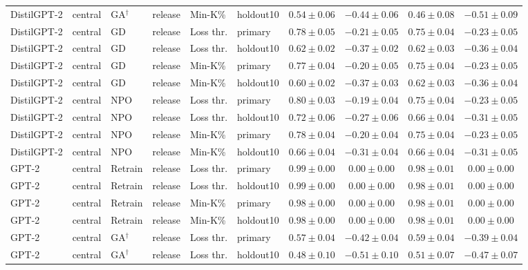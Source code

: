 {\begin{longtable}{@{\extracolsep{\fill}}llllllcccc@{}}
DistilGPT-2 & central & GA$^{\dagger}$ & release & Min-K\% & holdout10 & $0.54 \pm 0.06$ & $-0.44 \pm 0.06$ & $0.46 \pm 0.08$ & $-0.51 \pm 0.09$ \\
DistilGPT-2 & central & GD & release & Loss thr. & primary & $0.78 \pm 0.05$ & $-0.21 \pm 0.05$ & $0.75 \pm 0.04$ & $-0.23 \pm 0.05$ \\
DistilGPT-2 & central & GD & release & Loss thr. & holdout10 & $0.62 \pm 0.02$ & $-0.37 \pm 0.02$ & $0.62 \pm 0.03$ & $-0.36 \pm 0.04$ \\
DistilGPT-2 & central & GD & release & Min-K\% & primary & $0.77 \pm 0.04$ & $-0.20 \pm 0.05$ & $0.75 \pm 0.04$ & $-0.23 \pm 0.05$ \\
DistilGPT-2 & central & GD & release & Min-K\% & holdout10 & $0.60 \pm 0.02$ & $-0.37 \pm 0.03$ & $0.62 \pm 0.03$ & $-0.36 \pm 0.04$ \\
DistilGPT-2 & central & NPO & release & Loss thr. & primary & $0.80 \pm 0.03$ & $-0.19 \pm 0.04$ & $0.75 \pm 0.04$ & $-0.23 \pm 0.05$ \\
DistilGPT-2 & central & NPO & release & Loss thr. & holdout10 & $0.72 \pm 0.06$ & $-0.27 \pm 0.06$ & $0.66 \pm 0.04$ & $-0.31 \pm 0.05$ \\
DistilGPT-2 & central & NPO & release & Min-K\% & primary & $0.78 \pm 0.04$ & $-0.20 \pm 0.04$ & $0.75 \pm 0.04$ & $-0.23 \pm 0.05$ \\
DistilGPT-2 & central & NPO & release & Min-K\% & holdout10 & $0.66 \pm 0.04$ & $-0.31 \pm 0.04$ & $0.66 \pm 0.04$ & $-0.31 \pm 0.05$ \\
GPT-2 & central & Retrain & release & Loss thr. & primary & $0.99 \pm 0.00$ & $0.00 \pm 0.00$ & $0.98 \pm 0.01$ & $0.00 \pm 0.00$ \\
GPT-2 & central & Retrain & release & Loss thr. & holdout10 & $0.99 \pm 0.00$ & $0.00 \pm 0.00$ & $0.98 \pm 0.01$ & $0.00 \pm 0.00$ \\
GPT-2 & central & Retrain & release & Min-K\% & primary & $0.98 \pm 0.00$ & $0.00 \pm 0.00$ & $0.98 \pm 0.01$ & $0.00 \pm 0.00$ \\
GPT-2 & central & Retrain & release & Min-K\% & holdout10 & $0.98 \pm 0.00$ & $0.00 \pm 0.00$ & $0.98 \pm 0.01$ & $0.00 \pm 0.00$ \\
GPT-2 & central & GA$^{\dagger}$ & release & Loss thr. & primary & $0.57 \pm 0.04$ & $-0.42 \pm 0.04$ & $0.59 \pm 0.04$ & $-0.39 \pm 0.04$ \\
GPT-2 & central & GA$^{\dagger}$ & release & Loss thr. & holdout10 & $0.48 \pm 0.10$ & $-0.51 \pm 0.10$ & $0.51 \pm 0.07$ & $-0.47 \pm 0.07$ \\

\end{longtable}}
